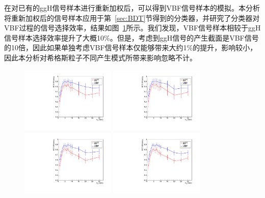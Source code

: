 在对已有的ggH信号样本进行重新加权后，可以得到VBF信号样本的模拟。本分析将重新加权后的信号样本应用于第~\ref{sec:BDT}节得到的分类器，并研究了分类器对VBF过程的信号选择效率，结果如图~\ref{fig:vbf_eff}所示。我们发现，VBF信号样本相较于ggH信号样本选择效率提升了大概10\%。但是，考虑到ggH信号的产生截面是VBF信号的10倍，因此如果单独考虑VBF信号样本仅能够带来大约1\%的提升，影响较小，因此本分析对希格斯粒子不同产生模式所带来影响忽略不计。

\begin{figure}[htbp]
  \begin{center}
		\includegraphics[width=0.4\textwidth]{Thesis (Version 2246)/figures/chapter04/BDT_eff_16APV.pdf}
  \includegraphics[width=0.4\textwidth]{Thesis (Version 2246)/figures/chapter04/BDT_eff_16.pdf}\\
  \includegraphics[width=0.4\textwidth]{Thesis (Version 2246)/figures/chapter04/BDT_eff_17.pdf}
  \includegraphics[width=0.4\textwidth]{Thesis (Version 2246)/figures/chapter04/BDT_eff_18.pdf}
    \label{fig:vbf_eff}
\end{center}
\end{figure}